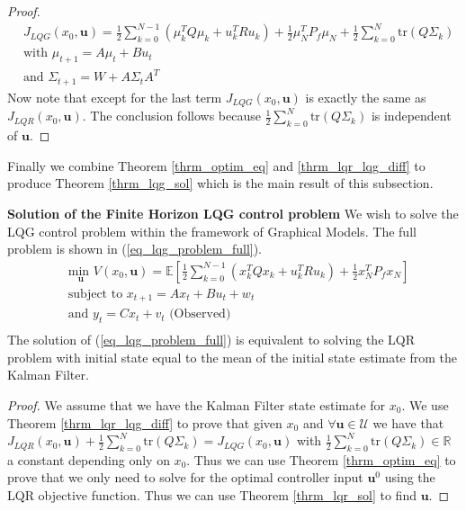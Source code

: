 \begin{proof}
\begin{equation}
\begin{aligned}
&J_{LQG}(x_0, \mathbf{u}) = \frac{1}{2}\sum_{k=0}^{N-1} \left( \mu_k^TQ\mu_k + u_k^TRu_k \right) + \frac{1}{2}\mu_N^TP_f\mu_N + \frac{1}{2}\sum_{k=0}^N \text{tr}(Q\Sigma_k) \\
&\text{with } \mu_{t+1} = A\mu_t +Bu_t \\
&\text{and } \Sigma_{t+1} = W+A\Sigma_t A^T 
\end{aligned}
\label{eq_simpl_obj_func}
\end{equation}
Now note that except for the last term $J_{LQG}(x_0, \mathbf{u})$ is exactly the same as $J_{LQR}(x_0, \mathbf{u})$. The conclusion follows because $\frac{1}{2}\sum_{k=0}^N \text{tr}(Q\Sigma_k)$ is independent of $\mathbf{u}$. 
\end{proof}
Finally we combine Theorem \ref{thrm_optim_eq} and \ref{thrm_lqr_lqg_diff} to produce Theorem \ref{thrm_lqg_sol} which is the main result of this subsection.
\begin{thrm}
\textbf{Solution of the Finite Horizon LQG control problem} We wish to solve the LQG control problem within the framework of Graphical Models. The full problem is shown in (\ref{eq_lqg_problem_full}).
\begin{equation}
\begin{aligned}
&\underset{\mathbf{u}}{\text{min }} V(x_0, \mathbf{u}) = \mathbb{E}\left[ \frac{1}{2}\sum_{k=0}^{N-1} \left( x_k^TQx_k + u_k^TRu_k \right) + \frac{1}{2}x_N^TP_fx_N \right] \\
& \text{subject to } x_{t+1}=Ax_t+Bu_t + w_t \\
& \text{and } y_{t}= Cx_t + v_t \text{ (Observed)}\\
\end{aligned}
\label{eq_lqg_problem_full}
\end{equation}
The solution of (\ref{eq_lqg_problem_full}) is equivalent to solving the LQR problem with initial state equal to the mean of the initial state estimate from the Kalman Filter.
\label{thrm_lqg_sol}
\end{thrm}
\begin{proof}
We assume that we have the Kalman Filter state estimate for $x_0$. We use Theorem \ref{thrm_lqr_lqg_diff} to prove that given $x_0$ and $\forall \mathbf{u} \in \mathcal{U}$ we have that $J_{LQR}(x_0, \mathbf{u}) + \frac{1}{2}\sum_{k=0}^N \text{tr}(Q\Sigma_k) = J_{LQG}(x_0, \mathbf{u})$ with $\frac{1}{2}\sum_{k=0}^N \text{tr}(Q\Sigma_k) \in \mathbb{R}$ a constant depending only on $x_0$. Thus we can use Theorem \ref{thrm_optim_eq} to prove that we only need to solve for the optimal controller input $\mathbf{u}^0$ using the LQR objective function. Thus we can use Theorem \ref{thrm_lqr_sol} to find $\mathbf{u}$. 
\end{proof}


